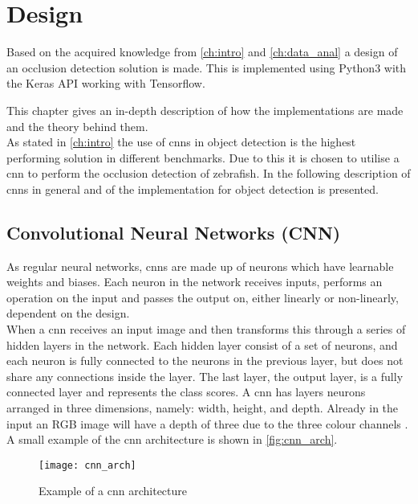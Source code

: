 \graphicspath{{figures/design/}}
\chapter{Design}\label{ch:design}
Based on the acquired knowledge from \autoref{ch:intro} and \autoref{ch:data_anal} a design of an occlusion detection solution is made. This is implemented using Python3 with the Keras API working with Tensorflow.

This chapter gives an in-depth description of how the implementations are made and the theory behind them.\\

As stated in \autoref{ch:intro} the use of \gls{cnn}s in object detection is the highest performing solution in different benchmarks. Due to this it is chosen to utilise a \gls{cnn} to perform the occlusion detection of zebrafish. In the following description of \gls{cnn}s in general and of the implementation for object detection is presented.

\section{Convolutional Neural Networks (CNN)}
As regular neural networks, \gls{cnn}s are made up of neurons which have learnable weights and biases. Each neuron in the network receives inputs, performs an operation on the input and passes the output on, either linearly or non-linearly, dependent on the design.\\

When a \gls{cnn} receives an input image and then transforms this through a series of hidden layers in the network. Each hidden layer consist of a set of neurons, and each neuron is fully connected to the neurons in the previous layer, but does not share any connections inside the layer. The last layer, the output layer, is a fully connected layer and represents the class scores. A \gls{cnn} has layers neurons arranged in three dimensions, namely: width, height, and depth. Already in the input an RGB image will have a depth of three due to the three colour channels \citep{Karpathy2019}. A small example of the \gls{cnn} architecture is shown in \autoref{fig:cnn_arch}.

\begin{figure}[H]
	\centering
	\texttt{[image: cnn\_arch]}
	\caption{Example of a \gls{cnn} architecture}
	\label{fig:cnn_arch}
\end{figure}

